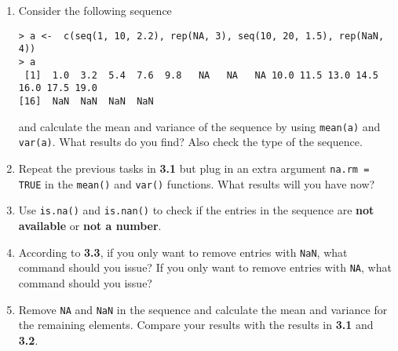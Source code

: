 \documentclass[a4paper]{article}
\begin{document}
\section{}
\begin{enumerate}
\item Consider the following sequence
\begin{verbatim}
> a <-  c(seq(1, 10, 2.2), rep(NA, 3), seq(10, 20, 1.5), rep(NaN, 4))
> a
 [1]  1.0  3.2  5.4  7.6  9.8   NA   NA   NA 10.0 11.5 13.0 14.5 16.0 17.5 19.0
[16]  NaN  NaN  NaN  NaN
\end{verbatim}
  and calculate the mean and variance of the sequence by using \texttt{mean(a)}
  and \texttt{var(a)}. What results do you find? Also check the type of the
  sequence.
\item Repeat the previous tasks in \textbf{3.1} but plug in an extra argument \texttt{na.rm =
    TRUE} in the \texttt{mean()} and \texttt{var()} functions. What results will
  you have now?
\item Use \texttt{is.na()} and \texttt{is.nan()} to check if the entries in the
  sequence are \textbf{not available} or \textbf{not a number}.
\item According to \textbf{3.3}, if you only want to remove entries with
  \texttt{NaN}, what command should you issue? If you only want to remove
  entries with \texttt{NA}, what command should you issue?
\item Remove \texttt{NA} and \texttt{NaN} in the sequence and calculate the
  mean and variance for the remaining elements. Compare your results with the
  results in \textbf{3.1} and \textbf{3.2}.
\end{enumerate}
\end{document}
